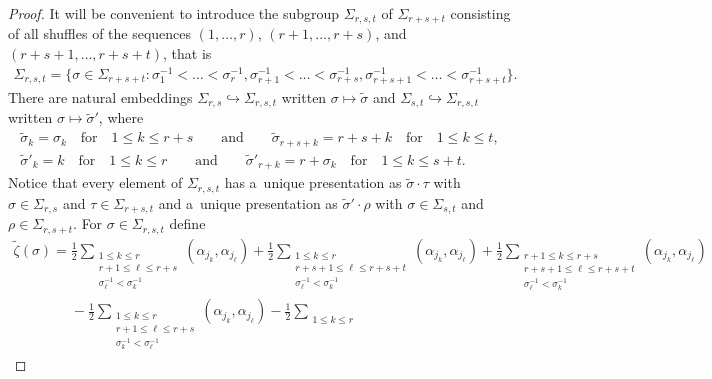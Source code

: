 \documentclass[pdftex]{sigma}
\numberwithin{equation}{section}
\begin{document}
\begin{proof}
It will be convenient to introduce the subgroup $\Sigma_{r,s,t}$ of $\Sigma_{r+s+t}$ consisting of all shuf\/f\/les of the
sequences $(1,\ldots,r)$, $(r+1,\ldots,r+s)$, and $(r+s+1,\ldots,r+s+t)$, that is
\begin{gather*}
\Sigma_{r,s,t}=\big\{\sigma\in\Sigma_{r+s+t}: \sigma^{-1}_1<\dots<\sigma^{-1}_r, \sigma^{-1}_{r+1}<\dots<\sigma^{-1}_{r+s},
\sigma^{-1}_{r+s+1}<\dots<\sigma^{-1}_{r+s+t}\big\}.
\end{gather*}
There are natural embeddings $\Sigma_{r,s}\hookrightarrow\Sigma_{r,s,t}$ written $\sigma\mapsto\widetilde\sigma$ and
$\Sigma_{s,t}\hookrightarrow\Sigma_{r,s,t}$ written $\sigma\mapsto\widetilde\sigma'$, where
\begin{gather*}
\widetilde\sigma_k=\sigma_k
\quad
\text{for}
\quad
1\le k\le r+s
\qquad
\text{and}
\qquad
\widetilde\sigma_{r+s+k}=r+s+k
\quad
\text{for}
\quad
1\le k\le t,
\\
\widetilde\sigma'_k=k
\quad
\text{for}
\quad
1\le k\le r
\qquad
\text{and}
\qquad
\widetilde\sigma'_{r+k}=r+\sigma_k
\quad
\text{for}
\quad
1\le k\le s+t.
\end{gather*}
Notice that every element of $\Sigma_{r,s,t}$ has a~unique presentation as $\widetilde\sigma\cdot\tau$ with
$\sigma\in\Sigma_{r,s}$ and $\tau\in\Sigma_{r+s,t}$ and a~unique presentation as $\widetilde\sigma'\cdot\rho$ with
$\sigma\in\Sigma_{s,t}$ and $\rho\in\Sigma_{r,s+t}$.
For $\sigma\in\Sigma_{r,s,t}$ def\/ine
\begin{gather*}
\widetilde\zeta(\sigma)=\frac{1}{2}\sum\limits_{\substack{1\le k\le r
\\
r+1\le\ell\le r+s
\\
\sigma_\ell^{-1}<\sigma_k^{-1}}}(\alpha_{j_k},\alpha_{j_\ell}) +\frac{1}{2}\sum\limits_{\substack{1\le k\le r
\\
r+s+1\le\ell\le r+s+t
\\
\sigma_\ell^{-1}<\sigma_k^{-1}}}(\alpha_{j_k},\alpha_{j_\ell}) +\frac{1}{2}\sum\limits_{\substack{r+1\le k\le r+s
\\
r+s+1\le\ell\le r+s+t
\\
\sigma_\ell^{-1}<\sigma_k^{-1}}}(\alpha_{j_k},\alpha_{j_\ell})
\\
\phantom{\widetilde\zeta(\sigma)=}{}
 -\frac{1}{2}\sum\limits_{\substack{1\le k\le r
\\
r+1\le\ell\le r+s
\\
\sigma_k^{-1}<\sigma_\ell^{-1}}}(\alpha_{j_k},\alpha_{j_\ell}) -\frac{1}{2}\sum\limits_{\substack{1\le k\le r
}}
\end{gather*}
\end{proof}
\end{document}
